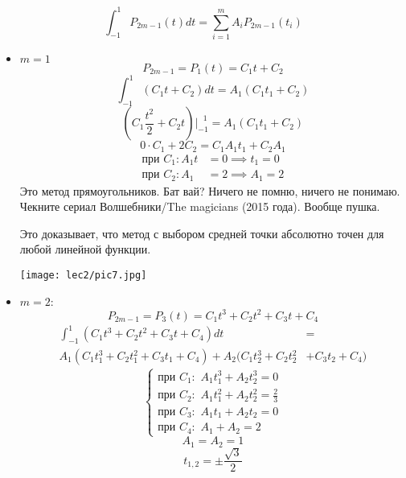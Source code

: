 \documentclass[12pt]{article}
\begin{document}
\begin{itemize}
    \[
      \int_{-1}^{1} P_{2m-1}(t)dt = \sum_{i=1}^{m} A_i P_{2m-1}(t_i)
    \] 

    \begin{itemize}
      \item \( m=1 \)
        \[
          P_{2m-1} = P_1(t) = C_1 t + C_2
        \] 
        \[
          \int_{-1}^{1} (C_1 t + C_2)dt = A_{1} (C_1 t_1 + C_2)
        \] 
        \[
          (C_{1} \frac{t^2}{2} + C_{2} t)\Big|_{-1}^{\text{ }1} =
          A_{1} (C_1 t_1 + C_2)
        \] 
        \[
          0 \cdot C_{1} + 2 C_{2} = C_{1} A_{1} t_{1} + C_{2} A_{1}
        \] 
        \begin{align*}
          \text{при } C_{1}: A_{1} t &= 0 \implies t_1 = 0 \\
          \text{при } C_{2}: A_{1} &= 2 \implies A_{1} = 2
        \end{align*}
        Это метод прямоугольников. Бат вай? Ничего не помню, ничего не
        понимаю. Чекните сериал Волшебники/The magicians (2015 года).
        Вообще пушка.

        Это доказывает, что метод с выбором средней точки абсолютно точен для
        любой линейной функции.

      \begin{center}
        \texttt{[image: lec2/pic7.jpg]}
      \end{center}
      \item \( m = 2 \):
        \[
          P_{2m-1} = P_{3}(t) = C_{1} t^3 + C_{2} t^2 + C_{3} t + C_{4}
        \]
        \begin{align*}
          \int_{-1}^{1} (C_{1} t^3 + C_{2} t^2 + C_{3} t + C_{4})dt &= \\
          A_{1} (C_{1} t_1^3 + C_{2} t_1^2 + C_{3} t_1 + C_{4}) +
          A_{2} (C_{1} t_2^3 + C_{2} t_2^2 &+ C_{3} t_2 + C_{4})
        \end{align*}
        \begin{equation*}
          \begin{cases}
            \text{при }C_{1}:
            \hspace{4pt} A_{1} t_{1}^3 + A_{2} t_{2}^3 = 0 \\
            \text{при }C_{2}:
            \hspace{4pt}A_{1} t_{1}^2 + A_{2} t_{2}^2 = \frac{2}{3} \\
            \text{при }C_{3}:
            \hspace{4pt}A_{1} t_{1} + A_{2} t_{2} = 0 \\
            \text{при }C_{4}:
            \hspace{4pt}A_{1} + A_{2} = 2
          \end{cases}
        \end{equation*}
        \[
          A_{1} = A_{2} = 1
        \] 
        \[
          t_{1, 2} = \pm \frac{\sqrt{3}}{2}
        \]


\end{itemize}
\end{itemize}
\end{document}
